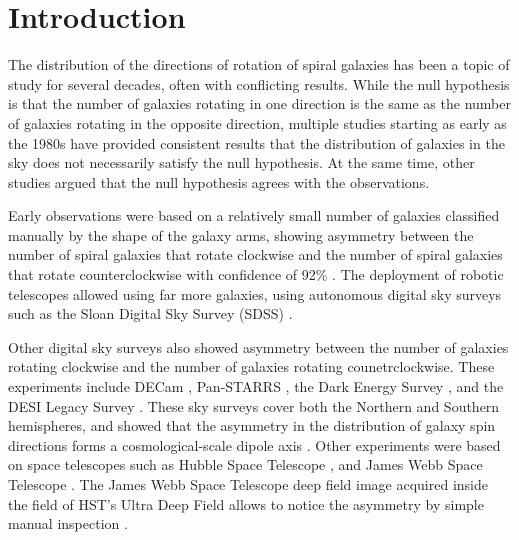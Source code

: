 \documentclass[final,5p,times,twocolumn]{article}
\begin{document}




\section{Introduction}
\label{introduction}

The distribution of the directions of rotation of spiral galaxies has been a topic of study for several decades, often with conflicting results. While the null hypothesis is that the number of galaxies rotating in one direction is the same as the number of galaxies rotating in the opposite direction, multiple studies starting as early as the 1980s have provided consistent results that the distribution of galaxies in the sky does not necessarily satisfy the null hypothesis. At the same time, other studies argued that the null hypothesis agrees with the observations. 

Early observations were based on a relatively small number of galaxies classified manually by the shape of the galaxy arms, showing asymmetry between the number of spiral galaxies that rotate clockwise and the number of spiral galaxies that rotate counterclockwise with confidence of 92\% \citep{macgillivray1985anisotropy}. The deployment of robotic telescopes allowed using far more galaxies, using autonomous digital sky surveys such as the Sloan Digital Sky Survey (SDSS) \citep{longo2011detection,shamir2012handedness,shamir2019large,shamir2020patterns,shamir2020large,shamir2021particles}.

Other digital sky surveys also showed asymmetry between the number of galaxies rotating clockwise and the number of galaxies rotating counetrclockwise. These experiments include DECam \citep{shamir2021large}, Pan-STARRS \citep{shamir2020patterns}, the Dark Energy Survey \citep{shamir2022asymmetry,shamir2022large}, and the DESI Legacy Survey \citep{shamir2022analysis}. These sky surveys cover both the Northern and Southern hemispheres, and showed that the asymmetry in the distribution of galaxy spin directions forms a cosmological-scale dipole axis \citep{shamir2020patterns,shamir2022asymmetry,shamir2021large,shamir2022analysis}. Other experiments were based on space telescopes such as Hubble Space Telescope \citep{shamir2020pasa}, and James Webb Space Telescope \citep{shamir2024galaxy}. The James Webb Space Telescope deep field image acquired inside the field of HST's Ultra Deep Field allows to notice the asymmetry by simple manual inspection \citep{shamir2024galaxy}.
\end{document}
